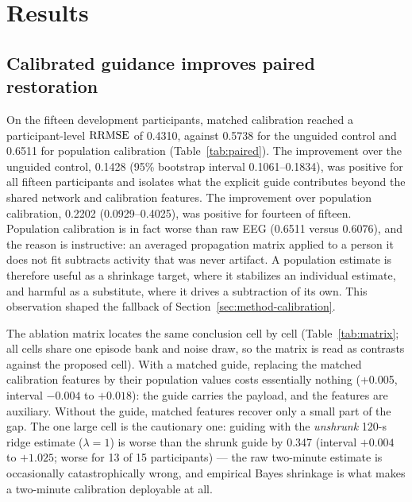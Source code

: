 \section{Results}
\label{sec:results}

\subsection{Calibrated guidance improves paired restoration}
\label{sec:res-paired}

On the fifteen development participants, matched calibration reached a participant-level $\mathrm{RRMSE}$ of 0.4310, against 0.5738 for the unguided control and 0.6511 for population calibration (Table~\ref{tab:paired}). The improvement over the unguided control, 0.1428 (95\% bootstrap interval 0.1061--0.1834), was positive for all fifteen participants and isolates what the explicit guide contributes beyond the shared network and calibration features. The improvement over population calibration, 0.2202 (0.0929--0.4025), was positive for fourteen of fifteen. Population calibration is in fact worse than raw EEG (0.6511 versus 0.6076), and the reason is instructive: an averaged propagation matrix applied to a person it does not fit subtracts activity that was never artifact. A population estimate is therefore useful as a shrinkage target, where it stabilizes an individual estimate, and harmful as a substitute, where it drives a subtraction of its own. This observation shaped the fallback of Section~\ref{sec:method-calibration}.

The ablation matrix locates the same conclusion cell by cell (Table~\ref{tab:matrix}; all cells share one episode bank and noise draw, so the matrix is read as contrasts against the proposed cell). With a matched guide, replacing the matched calibration features by their population values costs essentially nothing (+0.005, interval $-0.004$ to $+0.018$): the guide carries the payload, and the features are auxiliary. Without the guide, matched features recover only a small part of the gap. The one large cell is the cautionary one: guiding with the \emph{unshrunk} 120-s ridge estimate ($\lambda=1$) is worse than the shrunk guide by 0.347 (interval $+0.004$ to $+1.025$; worse for 13 of 15 participants) --- the raw two-minute estimate is occasionally catastrophically wrong, and empirical Bayes shrinkage is what makes a two-minute calibration deployable at all.

